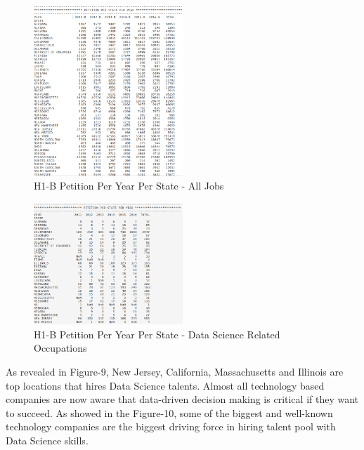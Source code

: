 \documentclass[9pt,twocolumn,twoside]{../../styles/osajnl}
\begin{document}
\begin{figure}[H]
  \centering
  \includegraphics[width=0.5\textwidth]{images/image13} 
       \vspace{-1em}
  \caption{H1-B Petition Per Year Per State - All Jobs}
       \vspace{-1em}
  \end{figure}

\begin{figure}[H]
  \centering
  \includegraphics[width=0.5\textwidth]{images/image18}
     \vspace{-1em}
  \caption{H1-B Petition Per Year Per State - Data Science Related Occupations}
     \vspace{-1em}
  \end{figure}

As revealed in Figure-9, New Jersey, California, Massachusetts and Illinois are top locations that hires Data Science talents. Almost all technology based companies are now aware that data-driven decision making is critical if they want to succeed. As showed in the Figure-10, some of the biggest and well-known technology companies are the biggest driving force in hiring talent pool with Data Science skills. 
\end{document}
